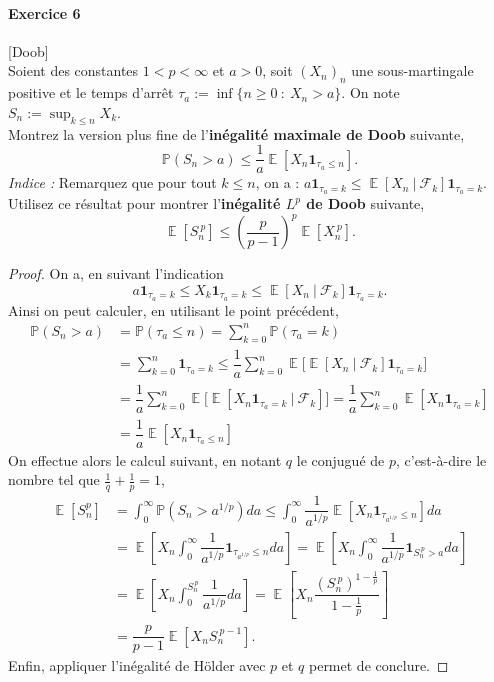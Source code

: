 \documentclass{article}
\theoremstyle{definition}
\numberwithin{equation}{section}
\DeclareMathOperator{\E}{\mathbb{E}}
\begin{document}
\paragraph{Exercice 6}[Doob]~\\
Soient des constantes $1<p<\infty$ et $a>0$, soit $(X_n)_n$ une sous-martingale positive et le temps d'arrêt $\tau_a:=\inf\{n\geq 0~:~X_n>a\}$. On note $S_n:=\sup_{k\leq n}X_k$.\\
Montrez la version plus fine de l'\textbf{inégalité maximale de Doob} suivante,
$$\mathbb{P}(S_n>a)\leq \dfrac{1}{a}\E[X_n\mathbf{1}_{\tau_a\leq n}].$$
\textit{Indice :} Remarquez que pour tout $ k\leq n$, on a : $a\mathbf{1}_{\tau_a =k} \leq \E[X_n~|~\mathcal{F}_k]\mathbf{1}_{\tau_a =k}$.
~\\
Utilisez ce résultat pour montrer l'\textbf{inégalité $L^p$ de Doob} suivante,
$$\E[S_n^{~p}]\leq \left(\dfrac{p}{p-1}\right)^p \E[X_n^{~p}].$$

\begin{proof}
On a, en suivant l'indication
$$a\mathbf{1}_{\tau_a =k} \leq X_k\mathbf{1}_{\tau_a =k} \leq  \E[X_n~|~\mathcal{F}_k]\mathbf{1}_{\tau_a =k}.$$
Ainsi on peut calculer, en utilisant le point précédent,
\begin{align*}
\mathbb{P}(S_n>a)&=\mathbb{P}(\tau_a\leq n) = \sum_{k=0}^n\mathbb{P}(\tau_a=k)\\
&=\sum_{k=0}^n\mathbf{1}_{\tau_a=k} \leq \dfrac{1}{a}\sum_{k=0}^n\E\big[\E[X_n~|~\mathcal{F}_k]\mathbf{1}_{\tau_a=k}\big]\\
&=\dfrac{1}{a}\sum_{k=0}^n\E\big[\E[X_n\mathbf{1}_{\tau_a=k}~|~\mathcal{F}_k]\big]=\dfrac{1}{a}\sum_{k=0}^n\E[X_n\mathbf{1}_{\tau_a=k}]\\
&=\dfrac{1}{a}\E[X_n\mathbf{1}_{\tau_a\leq n}]
\end{align*}
On effectue alors le calcul suivant, en notant $q$ le conjugué de $p$, c'est-à-dire le nombre tel que $\frac{1}{q}+\frac{1}{p}=1$,
\begin{align*}
\E[S_n^p]&=\int_0^\infty \mathbb{P}(S_n>a^{1/p})da \leq \int_0^\infty \dfrac{1}{a^{1/p}}\E[X_n\mathbf{1}_{\tau_{a^{1/p}}\leq n}]da\\
&=\E\left[X_n\int_0^\infty \dfrac{1}{a^{1/p}}\mathbf{1}_{\tau_{a^{1/p}}\leq n}da\right] = \E\left[X_n\int_0^\infty \dfrac{1}{a^{1/p}}\mathbf{1}_{S_n^{~p}>a}da\right]\\
&= \E\left[X_n\int_0^{S_n^{~p}} \dfrac{1}{a^{1/p}}da\right] = \E\left[X_n \dfrac{(S_n^{~p})^{1-\frac{1}{p}}}{1-\frac{1}{p}} \right]\\
&= \dfrac{p}{p-1}\E\left[X_n S_n^{~p-1} \right].
\end{align*}
Enfin, appliquer l'inégalité de Hölder avec $p$ et $q$ permet de conclure.
\end{proof}
\end{document}

